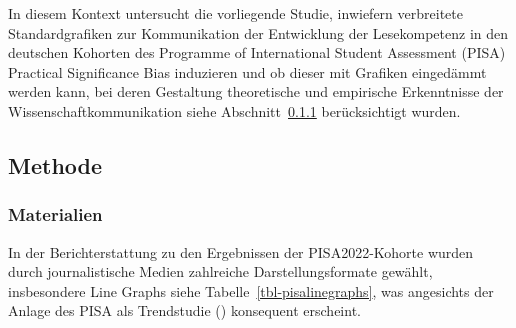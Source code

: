 \documentclass[
  jou,
  floatsintext,
  longtable,
  nolmodern,
  notxfonts,
  notimes,
  colorlinks=true,linkcolor=blue,citecolor=blue,urlcolor=blue]{apa7}
\begin{document}
In diesem Kontext untersucht die vorliegende Studie, inwiefern
verbreitete Standardgrafiken zur Kommunikation der Entwicklung der
Lesekompetenz in den deutschen Kohorten des Programme of International
Student Assessment (PISA) Practical Significance Bias induzieren und ob
dieser mit Grafiken eingedämmt werden kann, bei deren Gestaltung
theoretische und empirische Erkenntnisse der Wissenschaftkommunikation
siehe Abschnitt~\ref{sec-materialien} berücksichtigt wurden.

\subsection{Methode}\label{methode}

\subsubsection{Materialien}\label{sec-materialien}

In der Berichterstattung zu den Ergebnissen der PISA2022-Kohorte wurden
durch journalistische Medien zahlreiche Darstellungsformate gewählt,
insbesondere Line Graphs siehe Tabelle~\ref{tbl-pisalinegraphs}, was
angesichts der Anlage des PISA als Trendstudie
() konsequent
erscheint.
\end{document}
